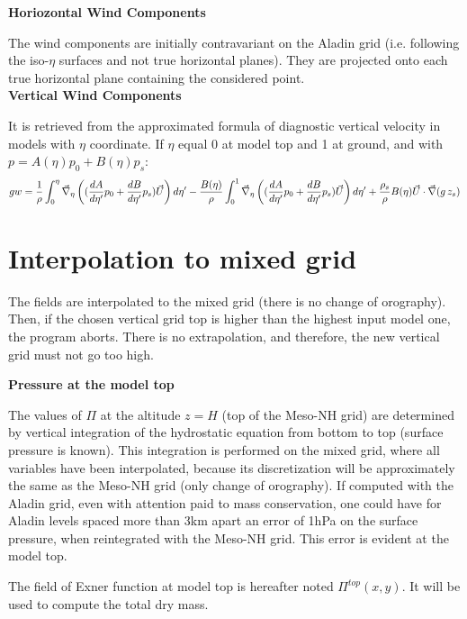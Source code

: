 {\bf Horiozontal Wind Components}

The wind components are initially contravariant on the Aladin grid
(i.e. following the iso-$\eta$ surfaces and not true horizontal planes).
They are projected onto each true horizontal plane containing the considered
point.\\

{\bf Vertical Wind Components}

It is retrieved from the approximated formula of diagnostic vertical velocity
in models with $\eta$ coordinate. If $\eta$ equal 0 at model top
and 1 at ground, and with  $p=A(\eta)p_{0}+B(\eta)p_{s}$:
\begin{displaymath}
gw=\frac{1}{\rho}\int^\eta_0\vec{\nabla}_\eta
\left( (\frac{dA}{d\eta '}p_0+\frac{dB}{d\eta '}p_{s})\vec{U}\right) d\eta '
-\frac{B(\eta)}{\rho}\int^1_0\vec{\nabla}_\eta
\left((\frac{dA}{d\eta '}p_0+\frac{dB}{d\eta '}p_{s})\vec{U}\right) d\eta '
+\frac{\rho_{s}}{\rho}B(\eta)\vec{U}\cdot \vec{\nabla}(g\, z_{s})
\end{displaymath}

\section{Interpolation to mixed grid}

The fields are interpolated to the mixed grid (there is no
change of orography).
Then, if the chosen vertical grid top is higher than the highest
input model one,
the program aborts. There is no extrapolation, and therefore, the
new vertical grid must not go too high.

{\bf Pressure at the model top}

The values of $\Pi$ at the altitude $z=H$ (top of the Meso-NH grid) are
determined by vertical integration of the hydrostatic equation from bottom
to top (surface pressure is known).
This integration is performed on the mixed grid, where all
variables have been interpolated, because its discretization
will be approximately the same as the Meso-NH grid (only change of orography).
If computed with the Aladin grid, even with attention paid to mass
conservation, one could have for Aladin levels spaced more than 3km apart
an error of 1hPa on the surface pressure, when reintegrated with the Meso-NH
grid. This error is evident at the model top.

The field of Exner function at model top is hereafter noted
$\Pi^{top}(x,y)$.  It will be used to compute the total dry mass.\\


